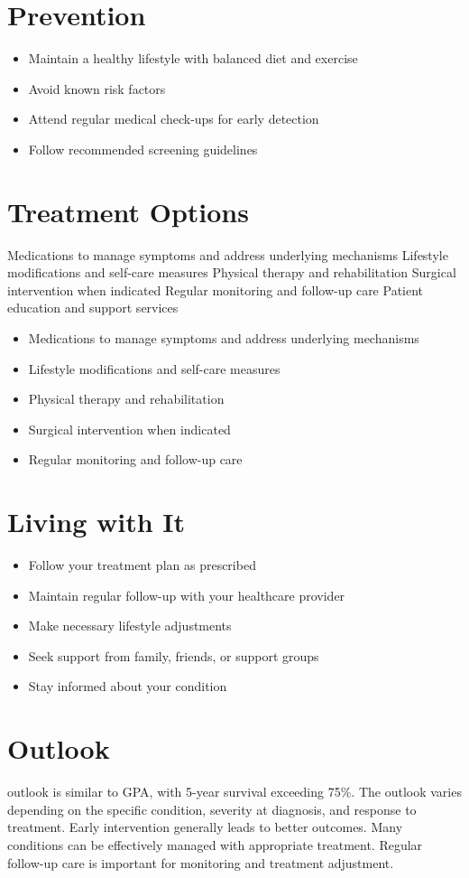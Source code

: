 \section{Prevention}
\begin{itemize}[noitemsep]
  \item Maintain a healthy lifestyle with balanced diet and exercise
  \item Avoid known risk factors
  \item Attend regular medical check-ups for early detection
  \item Follow recommended screening guidelines
\end{itemize}
\section{Treatment Options}
Medications to manage symptoms and address underlying mechanisms Lifestyle modifications and self-care measures Physical therapy and rehabilitation Surgical intervention when indicated Regular monitoring and follow-up care Patient education and support services

\begin{itemize}[noitemsep]
  \item Medications to manage symptoms and address underlying mechanisms
  \item Lifestyle modifications and self-care measures
  \item Physical therapy and rehabilitation
  \item Surgical intervention when indicated
  \item Regular monitoring and follow-up care
\end{itemize}
\section{Living with It}
\begin{itemize}[noitemsep]
  \item Follow your treatment plan as prescribed
  \item Maintain regular follow-up with your healthcare provider
  \item Make necessary lifestyle adjustments
  \item Seek support from family, friends, or support groups
  \item Stay informed about your condition
\end{itemize}
\section{Outlook}
outlook is similar to GPA, with 5-year survival exceeding 75\%. The outlook varies depending on the specific condition, severity at diagnosis, and response to treatment. Early intervention generally leads to better outcomes. Many conditions can be effectively managed with appropriate treatment. Regular follow-up care is important for monitoring and treatment adjustment.
